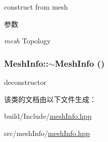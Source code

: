 construct from mesh 
\begin{DoxyParams}{参数}
\item[{\em mesh}]Topology \end{DoxyParams}
\hypertarget{classMeshInfo_a0c6b7e15ff450757e92402f80e93ede6}{
\subsubsection[{$\sim$MeshInfo}]{\setlength{\rightskip}{0pt plus 5cm}MeshInfo::$\sim$MeshInfo ()}}
\label{classMeshInfo_a0c6b7e15ff450757e92402f80e93ede6}


deconstructor 

该类的文档由以下文件生成：\begin{DoxyCompactItemize}
\item 
build/Include/\hyperlink{build_2Include_2meshInfo_8hpp}{meshInfo.hpp}\item 
src/meshInfo/\hyperlink{src_2meshInfo_2meshInfo_8hpp}{meshInfo.hpp}\end{DoxyCompactItemize}
